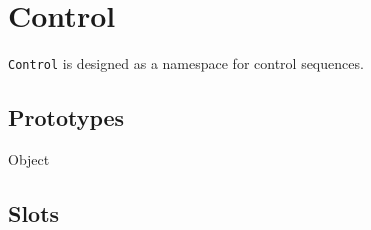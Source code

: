 \section{Control}

\lstinline|Control| is designed as a namespace for control sequences.

\subsection{Prototypes}

\begin{refObjects}
\item[Object]
\end{refObjects}

\subsection{Slots}

